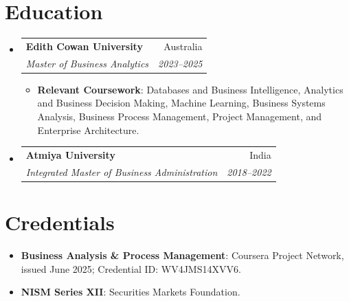 \documentclass[letterpaper,9.5pt]{article}
\makeatletter
\newcommand{\resumeItem}[2]{
  \item\small{
    \textbf{#1}{: #2 \vspace{-2pt}}
  }
}
\newcommand{\resumeSubheading}[4]{
  \vspace{-1pt}\item
    \begin{tabular*}{0.97\textwidth}{l@{\extracolsep{\fill}}r}
      \textbf{#1} & #2 \\
      \textit{\small #3} & \textit{\small #4} \\
    \end{tabular*}\vspace{-5pt}
}
\newcommand{\resumeSubItem}[2]{\resumeItem{#1}{#2}\vspace{-4pt}}
\newcommand{\resumeSubHeadingListStart}{\begin{itemize}[leftmargin=*]}
\newcommand{\resumeSubHeadingListEnd}{\end{itemize}}
\newcommand{\resumeItemListStart}{\begin{itemize}}
\newcommand{\resumeItemListEnd}{\end{itemize}\vspace{-5pt}}
\makeatother
\begin{document}
\section{Education}
\resumeSubHeadingListStart
  \resumeSubheading
    {Edith Cowan University}{Australia}
    {Master of Business Analytics}{2023--2025}
    \resumeItemListStart
      \resumeItem{Relevant Coursework}
        {Databases and Business Intelligence, Analytics and Business Decision Making, Machine Learning, Business Systems Analysis, Business Process Management, Project Management, and Enterprise Architecture.}
    \resumeItemListEnd
  \resumeSubheading
    {Atmiya University}{India}
    {Integrated Master of Business Administration}{2018--2022}
\resumeSubHeadingListEnd

\section{Credentials}
\resumeSubHeadingListStart
  \resumeSubItem{Business Analysis \& Process Management}
    {Coursera Project Network, issued June 2025; Credential ID: WV4JMS14XVV6.}
  \resumeSubItem{NISM Series XII}
    {Securities Markets Foundation.}
\resumeSubHeadingListEnd
\end{document}
